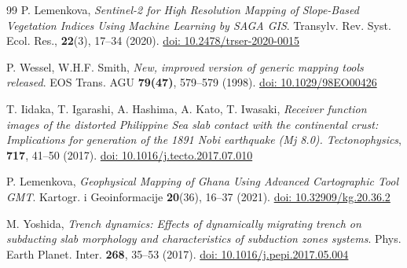 \documentclass{rrparticle}
\begin{document}
\begin{thebibliography}{99}
P. Lemenkova, \emph{Sentinel-2 for High Resolution Mapping of Slope-Based Vegetation Indices Using Machine Learning by SAGA GIS}. Transylv. Rev. Syst. Ecol. Res., \textbf{22}(3), 17--34 (2020). \href{https://doi.org/10.2478/trser-2020-0015}{doi: 10.2478/trser-2020-0015}

 P. Wessel, W.H.F. Smith, \emph{New, improved version of generic mapping tools released}. EOS Trans. AGU \textbf{79(47)}, 579--579 (1998). \href{https://doi.org/10.1029/98EO00426}{doi: 10.1029/98EO00426}

 T. Iidaka, T. Igarashi, A. Hashima, A. Kato, T. Iwasaki, \emph{{Receiver function images of the distorted Philippine Sea slab contact with the continental crust: Implications for generation of the 1891 Nobi earthquake (Mj 8.0)}. Tectonophysics}, \textbf{717}, 41--50 (2017). \href{https://doi.org/10.1016/j.tecto.2017.07.010}{doi: 10.1016/j.tecto.2017.07.010}

 P. Lemenkova, \emph{Geophysical Mapping of Ghana Using Advanced Cartographic Tool GMT}. Kartogr. i Geoinformacije \textbf{20}(36), 16--37 (2021). \href{https://doi.org/10.32909/kg.20.36.2}{doi: 10.32909/kg.20.36.2}

 M. Yoshida, \emph{Trench dynamics: Effects of dynamically migrating trench on subducting slab morphology and characteristics of subduction zones systems}. Phys. Earth Planet. Inter. \textbf{268}, 35--53 (2017). \href{https://doi.org/10.1016/j.pepi.2017.05.004}{doi: 10.1016/j.pepi.2017.05.004}

\end{thebibliography}
\end{document}
